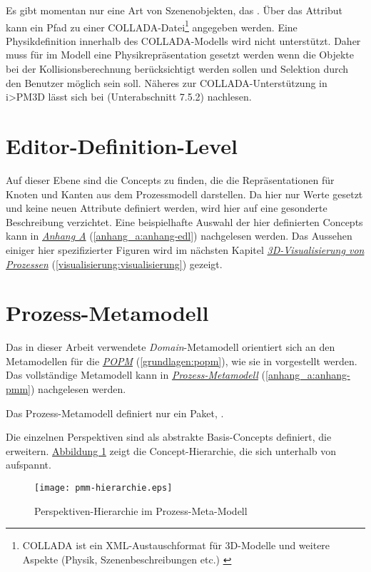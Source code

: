 \documentclass[a4paper,10pt]{sphinxmanual}
\begin{document}
Es gibt momentan nur eine Art von Szenenobjekten, das . Über das Attribut  kann ein Pfad zu einer COLLADA-Datei\footnote{
COLLADA ist ein XML-Austauschformat für 3D-Modelle und weitere Aspekte (Physik, Szenenbeschreibungen etc.) \cite{www:collada}
} angegeben werden.
Eine Physikdefinition innerhalb des COLLADA-Modells wird nicht unterstützt.
Daher muss für  im Modell eine Physikrepräsentation gesetzt werden wenn die Objekte bei der Kollisionsberechnung berücksichtigt werden sollen und Selektion durch den Benutzer möglich sein soll.
Näheres zur COLLADA-Unterstützung in i\textgreater{}PM3D lässt sich bei \cite{uli} (Unterabschnitt 7.5.2) nachlesen.


\section{Editor-Definition-Level}
\label{metamodelle:editor-definition-level}\label{metamodelle:edl}
Auf dieser Ebene sind die Concepts zu finden, die die Repräsentationen für Knoten und Kanten aus dem Prozessmodell darstellen.
Da hier nur Werte gesetzt und keine neuen Attribute definiert werden, wird hier auf eine gesonderte Beschreibung verzichtet.
Eine beispielhafte Auswahl der hier definierten Concepts kann in {\hyperref[anhang_a:anhang-edl]{\emph{Anhang A}}} (\autoref*{anhang_a:anhang-edl}) nachgelesen werden.
Das Aussehen einiger hier spezifizierter Figuren wird im nächsten Kapitel {\hyperref[visualisierung:visualisierung]{\emph{3D-Visualisierung von Prozessen}}} (\autoref*{visualisierung:visualisierung}) gezeigt.


\section{Prozess-Metamodell}
\label{metamodelle:pmm}\label{metamodelle:prozess-metamodell}
Das in dieser Arbeit verwendete \emph{Domain}-Metamodell orientiert sich an den Metamodellen für die {\hyperref[grundlagen:popm]{\emph{POPM}}} (\autoref*{grundlagen:popm}), wie sie in \cite{volz_werkzeugunterstutzung_2011} vorgestellt werden.
Das vollständige Metamodell kann in {\hyperref[anhang_a:anhang-pmm]{\emph{Prozess-Metamodell}}} (\autoref*{anhang_a:anhang-pmm}) nachgelesen werden.

Das Prozess-Metamodell definiert nur ein Paket, .

Die einzelnen Perspektiven sind als abstrakte Basis-Concepts definiert, die  erweitern.
\hyperref[metamodelle:pmm-hierarchie]{Abbildung  \ref*{metamodelle:pmm-hierarchie}} zeigt die Concept-Hierarchie, die sich unterhalb von  aufspannt.
\begin{figure}[htbp]
\centering
\capstart

\texttt{[image: pmm-hierarchie.eps]}
\caption{Perspektiven-Hierarchie im Prozess-Meta-Modell}\label{metamodelle:pmm-hierarchie}\end{figure}
\end{document}
